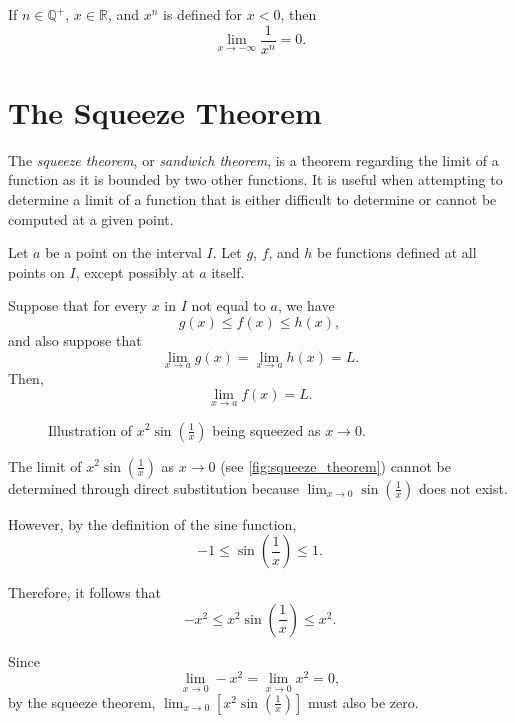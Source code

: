 \documentclass[headings=standardclasses]{scrreprt}
\begin{document}
\begin{nfact}
  If \(n ∈ ℚ^{+}\), \(x ∈ ℝ\), and \(x^{n}\) is defined for \(x < 0\), then
  \[ \lim_{x → -∞} \frac{1}{x^{n}} = 0. \]
\end{nfact}

\section{The Squeeze Theorem}

The \emph{squeeze theorem}, or \emph{sandwich theorem}, is a theorem regarding
the limit of a function as it is bounded by two other functions. It is useful
when attempting to determine a limit of a function that is either difficult to
determine or cannot be computed at a given point.

\begin{theorem}
  Let \(a\) be a point on the interval \(I\). Let \(g\), \(f\), and \(h\) be
  functions defined at all points on \(I\), except possibly at \(a\) itself.

  Suppose that for every \(x\) in \(I\) not equal to \(a\), we have
  \[ g(x) ≤ f(x) ≤ h(x), \] and also suppose that
  \[ \lim_{x → a } g(x) = \lim_{x → a} h(x) = L. \] Then,
  \[ \lim_{x → a} f(x) = L. \]
\end{theorem}

\begin{figure}[h]
  \centering


  \caption{Illustration of \(x^{2} \sin(\frac{1}{x})\) being squeezed as \(x → 0\).}\label{fig:squeeze_theorem}
\end{figure}

\begin{example}
  The limit of \(x^{2} \sin(\frac{1}{x})\) as \(x → 0\) (see
  \autoref{fig:squeeze_theorem}) cannot be determined through direct
  substitution because \(\lim_{x → 0} \sin(\frac{1}{x})\) does not exist.

  However, by the definition of the sine function,
  \[ -1 ≤ \sin(\frac{1}{x}) ≤ 1. \]

  Therefore, it follows that \[ -x^{2} ≤ x^{2} \sin(\frac{1}{x}) ≤ x^{2}. \]

  Since \[ \lim_{x → 0} -x^{2} = \lim_{x → 0} x^{2} = 0, \] by the squeeze
  theorem, \(\lim_{x → 0} [x^{2} \sin(\frac{1}{x})]\) must also be zero.
\end{example}
\end{document}
